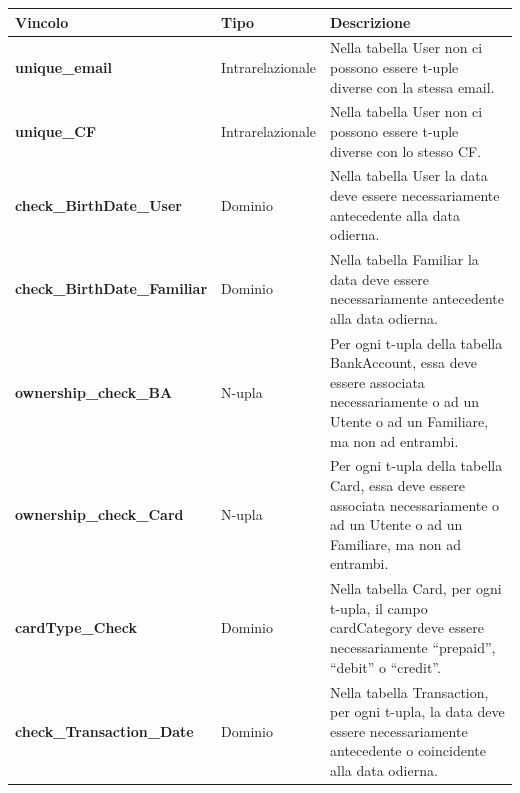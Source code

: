 \begin{longtable}{m{5.2cm}|m{2.8cm}|m{5.3cm}}
    
    \rowcolor{black!10}
    \textbf{Vincolo} & \textbf{Tipo} & \textbf{Descrizione} \\ \hline
    \endhead

    \raggedright \textbf{unique\_email} & \raggedright Intrarelazionale &
    Nella tabella User non ci possono essere t-uple diverse con la stessa email. \\ \hline

    \raggedright \textbf{unique\_CF} & \raggedright Intrarelazionale &
    Nella tabella User non ci possono essere t-uple diverse con lo stesso CF. \\ \hline

    \raggedright \textbf{check\_BirthDate\_User} & \raggedright Dominio &
    Nella tabella User la data deve essere necessariamente antecedente alla data odierna. \\ \hline

    \raggedright \textbf{check\_BirthDate\_Familiar} & \raggedright Dominio &
    Nella tabella Familiar la data deve essere necessariamente antecedente alla data odierna. \\ \hline

    \raggedright \textbf{ownership\_check\_BA} & \raggedright N-upla &
    Per ogni t-upla della tabella BankAccount, essa deve essere associata necessariamente o ad un Utente o ad un Familiare, ma non ad entrambi. \\ \hline

    \raggedright \textbf{ownership\_check\_Card} & \raggedright N-upla &
    Per ogni t-upla della tabella Card, essa deve essere associata necessariamente o ad un Utente o ad un Familiare, ma non ad entrambi. \\ \hline

    \raggedright \textbf{cardType\_Check} & \raggedright Dominio &
    Nella tabella Card, per ogni t-upla, il campo cardCategory deve essere necessariamente “prepaid”, “debit” o “credit”. \\ \hline

    \raggedright \textbf{check\_Transaction\_Date} & \raggedright Dominio &
    Nella tabella Transaction, per ogni t-upla, la data deve essere necessariamente antecedente o coincidente alla data odierna. \\ \hline

\end{longtable}
